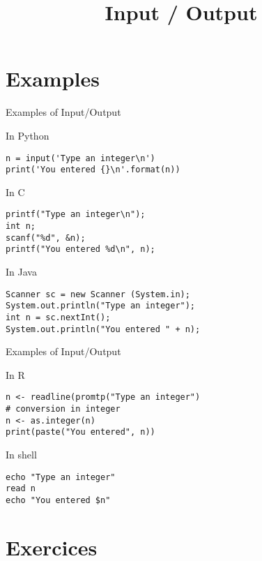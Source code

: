 \documentclass{beamer}
\title{Input / Output}
\begin{document}
\frame{
  \titlepage
}

\section{Examples}

\begin{frame}[fragile]{Examples of Input/Output}

  \begin{block}{In Python}
    \begin{lstlisting}[style=codePy]
n = input('Type an integer\n')
print('You entered {}\n'.format(n))
    \end{lstlisting}
  \end{block}

  \begin{block}{In C}
    \begin{lstlisting}[style=codeC]
printf("Type an integer\n");
int n;
scanf("%d", &n);
printf("You entered %d\n", n);
    \end{lstlisting}
  \end{block}

  \begin{block}{In Java}
    \begin{lstlisting}[style=codeJ]
Scanner sc = new Scanner (System.in);
System.out.println("Type an integer");
int n = sc.nextInt();
System.out.println("You entered " + n);
    \end{lstlisting}
  \end{block}

\end{frame}

\begin{frame}[fragile]{Examples of Input/Output}

  \begin{block}{In R}
    \begin{lstlisting}[style=codeR]
n <- readline(promtp("Type an integer")
# conversion in integer
n <- as.integer(n)
print(paste("You entered", n))
    \end{lstlisting}
  \end{block}

  \begin{block}{In shell}
    \begin{lstlisting}[style=codeS]
echo "Type an integer"
read n
echo "You entered $n"
    \end{lstlisting}
  \end{block}

\end{frame}


\section{Exercices}
\end{document}
